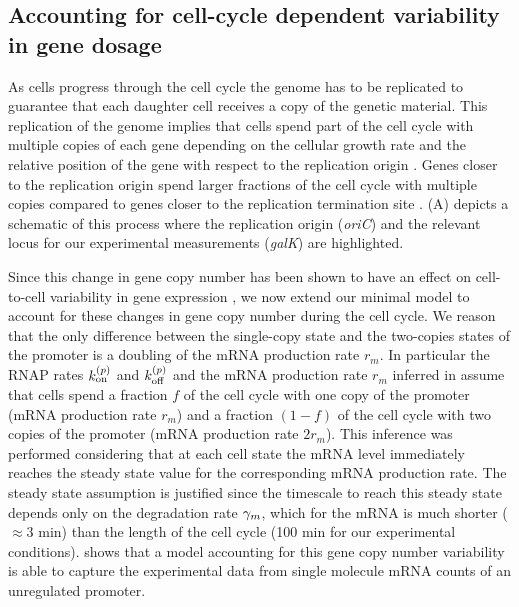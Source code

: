\subsection{Accounting for cell-cycle dependent variability in gene dosage}
\label{sec_cell_cycle}

As cells progress through the cell cycle the genome has to be replicated to
guarantee that each daughter cell receives a copy of the genetic material.
This replication of the genome implies that cells spend part of the cell cycle
with multiple copies of each gene depending on the cellular growth rate and the
relative position of the gene with respect to the replication origin
\cite{Bremer1996}. Genes closer to the replication origin spend larger fractions
of the cell cycle with multiple copies compared to genes closer to the
replication termination site \cite{Bremer1996}. (A)
depicts a schematic of this process where the replication origin ({\it oriC})
and the relevant locus for our experimental measurements ({\it galK}) are
highlighted.

Since this change in gene copy number has been shown to have an effect on
cell-to-cell variability in gene expression \cite{Jones2014a, Peterson2015}, we
now extend our minimal model to account for these changes in gene copy number
during the cell cycle.  We reason that the only difference between the
single-copy state and the two-copies states of the promoter is a doubling of the
mRNA production rate $r_m$. In particular the RNAP rates $k^{(p)}_{\text{on}}$ and $k^{(p)}_{\text{off}}$
and the mRNA production rate $r_m$ inferred in 
assume that cells spend a fraction $f$ of the cell cycle  with one copy of the
promoter (mRNA production rate $r_m$) and a fraction $(1-f)$ of the cell cycle
with two copies of the promoter (mRNA production rate $2 r_m$). This inference
was performed considering that at each cell state the mRNA level immediately
reaches the steady state value for the corresponding mRNA production rate. The
steady state assumption is justified since the timescale to reach this steady
state depends only on the degradation rate $\gamma _m$, which for the mRNA  is much
shorter ($\approx 3$ min) than the length of the cell cycle (100 min for our
experimental conditions).  shows that a model
accounting for this gene copy number variability is able to capture the
experimental data from single molecule mRNA counts of an unregulated promoter.


